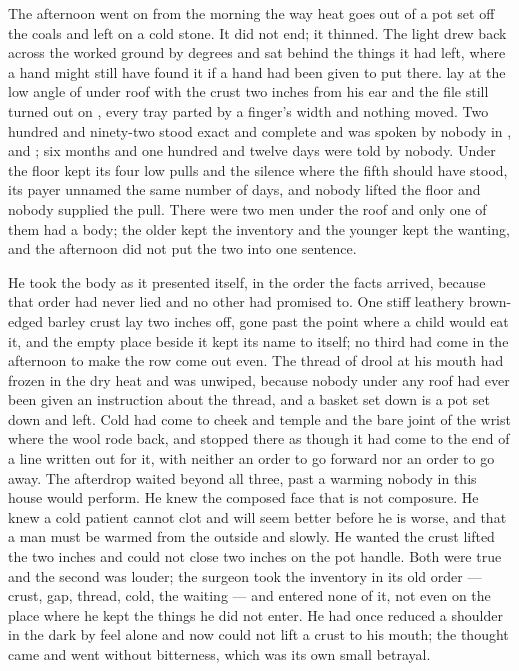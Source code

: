 The afternoon went on from the morning the way heat goes out of a pot set off the coals and left on a cold stone. It did not end; it thinned. The light drew back across the worked ground by degrees and sat behind the things it had left, where a hand might still have found it if a hand had been given to put there.  lay at the low angle of  under  roof with the crust two inches from his ear and the file still turned out on , every tray parted by a finger's width and nothing moved. Two hundred and ninety-two stood exact and complete and was spoken by nobody in ,  and ; six months and one hundred and twelve days were told by nobody. Under the floor  kept its four low pulls and the silence where the fifth should have stood, its payer unnamed the same number of days, and nobody lifted the floor and nobody supplied the pull. There were two men under the roof and only one of them had a body; the older kept the inventory and the younger kept the wanting, and the afternoon did not put the two into one sentence.

He took the body as it presented itself, in the order the facts arrived, because that order had never lied and no other had promised to. One stiff leathery brown-edged barley crust lay two inches off, gone past the point where a child would eat it, and the empty place beside it kept its name to itself; no third had come in the afternoon to make the row come out even. The thread of drool at his mouth had frozen in the dry heat and was unwiped, because nobody under any roof had ever been given an instruction about the thread, and a basket set down is a pot set down and left. Cold had come to cheek and temple and the bare joint of the wrist where the wool rode back, and stopped there as though it had come to the end of a line written out for it, with neither an order to go forward nor an order to go away. The afterdrop waited beyond all three, past a warming nobody in this house would perform. He knew the composed face that is not composure. He knew a cold patient cannot clot and will seem better before he is worse, and that a man must be warmed from the outside and slowly. He wanted the crust lifted the two inches and could not close two inches on the pot handle. Both were true and the second was louder; the surgeon took the inventory in its old order --- crust, gap, thread, cold, the waiting --- and entered none of it, not even on the place where he kept the things he did not enter. He had once reduced a shoulder in the dark by feel alone and now could not lift a crust to his mouth; the thought came and went without bitterness, which was its own small betrayal.

